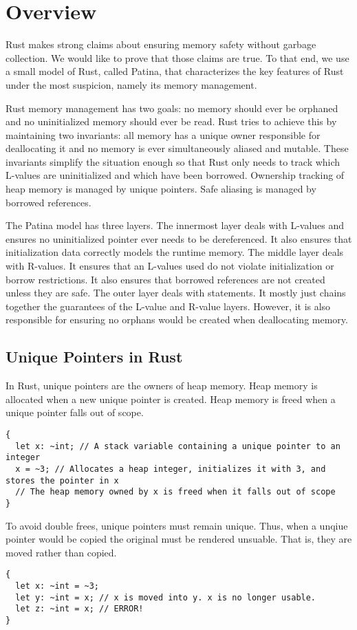 \section*{Overview}
Rust makes strong claims about ensuring memory safety without garbage collection.
We would like to prove that those claims are true.
To that end, we use a small model of Rust, called Patina, that characterizes the key
features of Rust under the most suspicion, namely its memory management.

Rust memory management has two goals:
no memory should ever be orphaned and no uninitialized memory should ever be read.
Rust tries to achieve this by maintaining two invariants:
all memory has a unique owner responsible for deallocating it and
no memory is ever simultaneously aliased and mutable.
These invariants simplify the situation enough so that
Rust only needs to track which L-values are uninitialized and which have been borrowed.
Ownership tracking of heap memory is managed by unique pointers.
Safe aliasing is managed by borrowed references.

The Patina model has three layers.
The innermost layer deals with L-values and ensures no uninitialized pointer
ever needs to be dereferenced. It also ensures that initialization data correctly
models the runtime memory.
The middle layer deals with R-values.
It ensures that an L-values used do not violate initialization or borrow restrictions.
It also ensures that borrowed references are not created unless they are safe.
The outer layer deals with statements.
It mostly just chains together the guarantees of the L-value and R-value layers.
However, it is also responsible for ensuring no orphans would be created when deallocating memory.

\subsection*{Unique Pointers in Rust}
In Rust, unique pointers are the owners of heap memory.
Heap memory is allocated when a new unique pointer is created.
Heap memory is freed when a unique pointer falls out of scope.
\begin{verbatim}
{
  let x: ~int; // A stack variable containing a unique pointer to an integer
  x = ~3; // Allocates a heap integer, initializes it with 3, and stores the pointer in x
  // The heap memory owned by x is freed when it falls out of scope
}
\end{verbatim}

To avoid double frees, unique pointers must remain unique.
Thus, when a unqiue pointer would be copied the original must be rendered unsuable.
That is, they are moved rather than copied.
\begin{verbatim}
{
  let x: ~int = ~3;
  let y: ~int = x; // x is moved into y. x is no longer usable.
  let z: ~int = x; // ERROR!
}
\end{verbatim}

